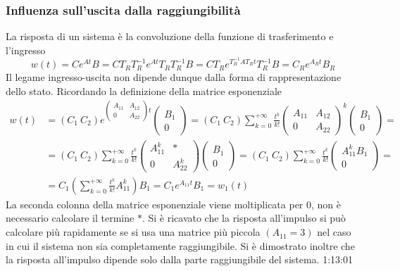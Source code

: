 \subsubsection{Influenza sull'uscita dalla raggiungibilità}
La risposta di un sistema è la convoluzione della funzione di trasferimento e
l'ingresso
$$
w(t) = Ce^{At}B = CT_RT_R^{-1}e^{At}T_RT_R^{-1}B
= CT_Re^{T_R^{-1}AT_Rt}T_R^{-1}B = C_Re^{A_Rt}B_R
$$
Il legame ingresso-uscita non dipende dunque dalla forma di rappresentazione
dello stato. Ricordando la definizione della matrice esponenziale
$$\begin{aligned}
w(t) &= (C_1\ C_2) e^{\begin{pmatrix}
A_{11} & A_{12} \\
0 & A_{22}
\end{pmatrix}t}\begin{pmatrix}
B_1 \\ 0
\end{pmatrix} =
(C_1 \ C_2) \sum_{k=0}^{+\infty} \frac{t^k}{k!}\begin{pmatrix}
A_{11} & A_{12} \\
0 & A_{22}
\end{pmatrix}^k
\begin{pmatrix}
B_1 \\ 0
\end{pmatrix} = \\
&= (C_1 \ C_2) \sum_{k=0}^{+\infty} \frac{t^k}{k!}
\begin{pmatrix}
A_{11}^k & * \\
0 & A_{22}^k
\end{pmatrix}
\begin{pmatrix}
B_1 \\ 0
\end{pmatrix} =
(C_1 \ C_2) \sum_{k=0}^{+\infty} \frac{t^k}{k!}
\begin{pmatrix}
A_{11}^k B_1 \\ 0
\end{pmatrix} = \\
&= C_1\left(\sum_{k=0}^{+\infty} \frac{t^k}{k!}
A_{11}^k\right)B_1 = C_1 e^{A_{11}t}B_1 = w_1(t)
\end{aligned}
$$
La seconda colonna della matrice esponenziale viene moltiplicata per 0, non è
necessario calcolare il termine $*$.
Si è ricavato che la risposta all'impulso si può calcolare più rapidamente se
si usa una matrice più piccola $(A_{11}=3)$ nel caso in cui il sistema non sia
completamente raggiungibile. Si è dimostrato inoltre che la risposta
all'impulso dipende solo dalla parte raggiungibile del sistema.
1:13:01
